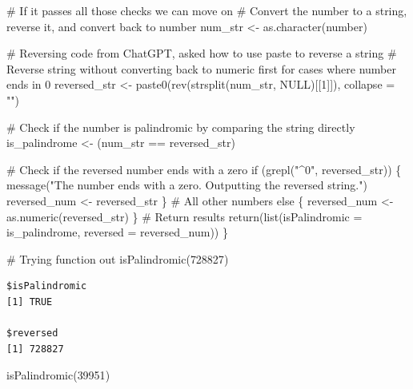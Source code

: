 \documentclass[
  letterpaper,
  DIV=11,
  numbers=noendperiod]{scrartcl}
\newenvironment{Shaded}{\begin{snugshade}}{\end{snugshade}}
\newcommand{\AttributeTok}[1]{\textcolor[rgb]{0.40,0.45,0.13}{#1}}
\newcommand{\CommentTok}[1]{\textcolor[rgb]{0.37,0.37,0.37}{#1}}
\newcommand{\ConstantTok}[1]{\textcolor[rgb]{0.56,0.35,0.01}{#1}}
\newcommand{\ControlFlowTok}[1]{\textcolor[rgb]{0.00,0.23,0.31}{#1}}
\newcommand{\DecValTok}[1]{\textcolor[rgb]{0.68,0.00,0.00}{#1}}
\newcommand{\FunctionTok}[1]{\textcolor[rgb]{0.28,0.35,0.67}{#1}}
\newcommand{\NormalTok}[1]{\textcolor[rgb]{0.00,0.23,0.31}{#1}}
\newcommand{\OtherTok}[1]{\textcolor[rgb]{0.00,0.23,0.31}{#1}}
\newcommand{\SpecialCharTok}[1]{\textcolor[rgb]{0.37,0.37,0.37}{#1}}
\newcommand{\StringTok}[1]{\textcolor[rgb]{0.13,0.47,0.30}{#1}}
\begin{document}
\begin{Shaded}
\begin{Highlighting}[]
  \CommentTok{\# If it passes all those checks we can move on  }
  \CommentTok{\# Convert the number to a string, reverse it, and convert back to number}
\NormalTok{  num\_str }\OtherTok{\textless{}{-}} \FunctionTok{as.character}\NormalTok{(number)}
  
  \CommentTok{\# Reversing code from ChatGPT, asked how to use paste to reverse a string}
  \CommentTok{\# Reverse string without converting back to numeric first for cases where number ends in 0}
\NormalTok{  reversed\_str }\OtherTok{\textless{}{-}} \FunctionTok{paste0}\NormalTok{(}\FunctionTok{rev}\NormalTok{(}\FunctionTok{strsplit}\NormalTok{(num\_str, }\ConstantTok{NULL}\NormalTok{)[[}\DecValTok{1}\NormalTok{]]), }\AttributeTok{collapse =} \StringTok{""}\NormalTok{)}
  
  \CommentTok{\# Check if the number is palindromic by comparing the string directly}
\NormalTok{  is\_palindrome }\OtherTok{\textless{}{-}}\NormalTok{ (num\_str }\SpecialCharTok{==}\NormalTok{ reversed\_str)}
  
  \CommentTok{\# Check if the reversed number ends with a zero}
  \ControlFlowTok{if}\NormalTok{ (}\FunctionTok{grepl}\NormalTok{(}\StringTok{"\^{}0"}\NormalTok{, reversed\_str)) \{}
    \FunctionTok{message}\NormalTok{(}\StringTok{"The number ends with a zero. Outputting the reversed string."}\NormalTok{)}
\NormalTok{    reversed\_num }\OtherTok{\textless{}{-}}\NormalTok{ reversed\_str}
\NormalTok{  \} }
  \CommentTok{\# All other numbers}
  \ControlFlowTok{else}\NormalTok{ \{}
\NormalTok{    reversed\_num }\OtherTok{\textless{}{-}} \FunctionTok{as.numeric}\NormalTok{(reversed\_str)}
\NormalTok{  \}}
  \CommentTok{\# Return results}
  \FunctionTok{return}\NormalTok{(}\FunctionTok{list}\NormalTok{(}\AttributeTok{isPalindromic =}\NormalTok{ is\_palindrome, }\AttributeTok{reversed =}\NormalTok{ reversed\_num))}
\NormalTok{\}}

\CommentTok{\# Trying function out}
\FunctionTok{isPalindromic}\NormalTok{(}\DecValTok{728827}\NormalTok{)}
\end{Highlighting}
\end{Shaded}

\begin{verbatim}
$isPalindromic
[1] TRUE

$reversed
[1] 728827
\end{verbatim}

\begin{Shaded}
\begin{Highlighting}[]
\FunctionTok{isPalindromic}\NormalTok{(}\DecValTok{39951}\NormalTok{)}
\end{Highlighting}
\end{Shaded}
\end{document}
